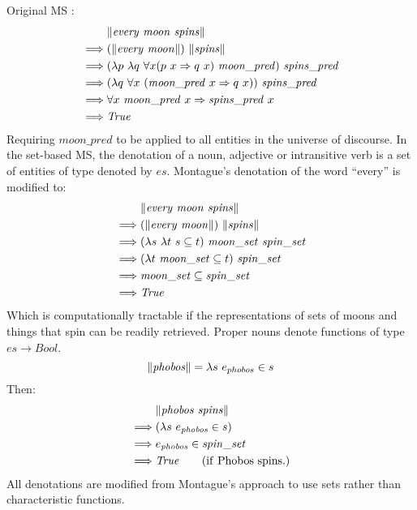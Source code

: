\documentclass[../main.tex]{subfiles}
\begin{document}
\begin{refsection}
Original MS \cite{Dowty:wall}:
\begin{equation*}
	\begin{split}
		& \lVert \mathit{\mathit{every} \  \mathit{moon} \  \mathit{spins}} \rVert \\
		\implies&  (\lVert \mathit{\mathit{every}\ \mathit{moon}} \rVert) \  \lVert \mathit{\mathit{spins}} \rVert \\
		\implies&  (\lambda p \  \lambda q \  \forall x (p \  x \Rightarrow q \  x) \  \mathit{\mathit{moon}\_pred}) \  \mathit{\mathit{spins}\_pred} \\
		\implies&  (\lambda q \  \forall x \  (\mathit{\mathit{moon}\_pred} \   x \Rightarrow q \   x)) \  \mathit{spins\_pred} \\
		\implies&  \forall x \  \mathit{\mathit{moon}\_pred} \   x \Rightarrow \mathit{spins\_pred} \   x \\
		\implies&  \mathit{True}
	\end{split}
\end{equation*}
Requiring $\mathit{moon\_pred}$ to be applied to all entities in the universe of discourse. In the set-based MS, the denotation of a noun, adjective or intransitive verb is a set of entities of type denoted by $\mathit{es}$.
Montague's denotation of the word ``every'' is modified to:
\begin{equation*}
	\begin{split}
		& \meaningof{\every \  \moon \  \spins} \\
		\implies&  (\meaningof{\every\ \moon}) \  \meaningof{\spins} \\
		\implies&  (\lambda s \ \lambda t \ s \subseteq t)\ \wordset{\moon} \ \wordset{\spin} \\
		\implies&  (\lambda t \ \wordset{\moon} \subseteq t)\ \wordset{\spin} \\
		\implies&  \wordset{\moon} \subseteq \wordset{\spin} \\
		\implies&  \True
	\end{split}
\end{equation*}
Which is computationally tractable if the representations of sets of moons and things that spin can be readily retrieved.
Proper nouns denote functions of type $\mathit{es} \rightarrow \mathit{Bool}$.
\[
\meaningof{\phobos} = \lambda s\ \entityassoc{phobos} \in s
\]
Then:
\begin{equation*}
	\begin{split}
		& \lVert \mathit{\mathit{phobos}\ \mathit{spins}} \rVert \\
		\implies& (\lambda s\ e_{\mathit{phobos}} \in s) \\
		\implies& e_{\mathit{phobos}} \in \mathit{spin\_set} \\
		\implies& \mathit{True} \qquad(\mathrm{if\ Phobos\ spins.})
	\end{split}
\end{equation*}
All denotations are modified from Montague's approach to use sets rather than characteristic functions.


\end{refsection}
\end{document}
